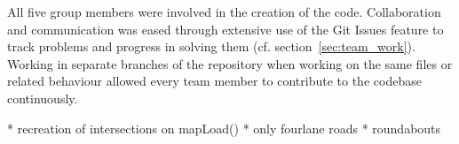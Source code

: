 All five group members were involved in the creation of the code. Collaboration and communication was eased through extensive use of the Git Issues feature to track problems and progress in solving them (cf. section~\ref{sec:team_work}). Working in separate branches of the repository when working on the same files or related behaviour allowed every team member to contribute to the codebase continuously.  

\bigskip
* recreation of intersections on mapLoad()
* only fourlane roads
* roundabouts
